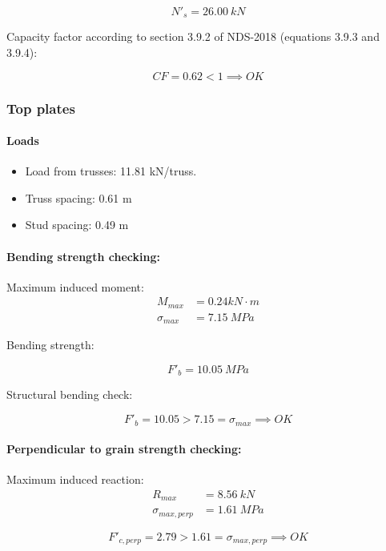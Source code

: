\begin{equation}
  N'_s= 26.00\ kN
\end{equation}

\noindent Capacity factor according to section 3.9.2 of NDS-2018 (equations 3.9.3 and 3.9.4):

\begin{equation}
  CF= 0.62 < 1 \implies OK
\end{equation}

\subsubsection{Top plates}

\paragraph{Loads}

\begin{itemize}
\item Load from trusses: 11.81 kN/truss.
\item Truss spacing: 0.61 m
\item Stud spacing: 0.49 m
\end{itemize}

\paragraph{Bending strength checking:}

\noindent Maximum induced moment:
\begin{align}
  M_{max}&= 0.24 kN \cdot m\\
  \sigma_{max}&= 7.15\ MPa
\end{align}

\noindent Bending strength:

\begin{equation}
  F'_b= 10.05\ MPa
\end{equation}

\noindent Structural bending check:

\begin{equation}
F'_b = 10.05 > 7.15 = \sigma_{max} \implies OK
\end{equation}

\paragraph{Perpendicular to grain strength checking:}

\noindent Maximum induced reaction:
\begin{align}
  R_{max}&= 8.56\ kN\\
  \sigma_{max,perp}&= 1.61\ MPa
\end{align}

\begin{equation}
F'_{c,perp} = 2.79 > 1.61 = \sigma_{max,perp} \implies OK
\end{equation}
